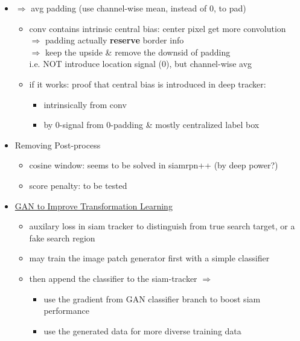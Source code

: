 \begin{itemize}
\begin{itemize}
\begin{itemize}
		\end{itemize}
	\item $\Rightarrow$ avg padding (use channel-wise mean, instead of 0, to pad)
		\begin{itemize}
		\item conv contains intrinsic central bias: center pixel get more convolution \\
		$\Rightarrow$ padding actually \textbf{reserve} border info \\
		$\Rightarrow$ keep the upside \& remove the downsid of padding \\
		i.e. NOT introduce location signal (0), but channel-wise avg
		\item if it works: proof that central bias is introduced in deep tracker:
			\begin{itemize}
			\item intrinsically from conv
			\item by 0-signal from 0-padding \& mostly centralized label box
			\end{itemize}
		\end{itemize}
	\item Removing Post-process
		\begin{itemize}
		\item cosine window: seems to be solved in siamrpn++ (by deep power?)
		\item score penalty: to be tested
		\end{itemize}
	\item \underline{GAN to Improve Transformation Learning}
		\begin{itemize}
		\item auxilary loss in siam tracker to distinguish from true search target, or a fake search region
		\item may train the image patch generator first with a simple classifier
		\item then append the classifier to the siam-tracker $\Rightarrow$
			\begin{itemize}
			\item use the gradient from GAN classifier branch to boost siam performance
			\item use the generated data for more diverse training data
			\end{itemize}
		\end{itemize}
	\end{itemize}
\end{itemize}

